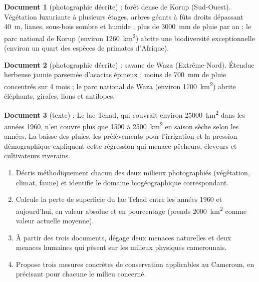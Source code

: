 \documentclass[11pt]{article}
\newcounter{popsec}
\newcounter{popsub}
\newcommand{\courssub}[1]{%
  \stepcounter{popsub}%
  \par\vspace{9pt}\noindent{\popxbold\fontsize{11.5}{13}\selectfont\color{popink}{\color{poporange}\thepopsec.\thepopsub}\hspace{6pt}#1}\par\nopagebreak\vspace{4pt}
}
\begin{document}
\courssub{Je me prépare au Bac}

\begin{exercice}
\textbf{Document 1} (photographie décrite) : forêt dense de Korup (Sud-Ouest). Végétation luxuriante à plusieurs étages, arbres géants à fûts droits dépassant \SI{40}{m}, lianes, sous-bois sombre et humide ; plus de \SI{3000}{mm} de pluie par an ; le parc national de Korup (environ \SI{1260}{km\squared}) abrite une biodiversité exceptionnelle (environ un quart des espèces de primates d'Afrique).

\textbf{Document 2} (photographie décrite) : savane de Waza (Extrême-Nord). Étendue herbeuse jaunie parsemée d'acacias épineux ; moins de \SI{700}{mm} de pluie concentrés sur 4 mois ; le parc national de Waza (environ \SI{1700}{km\squared}) abrite éléphants, girafes, lions et antilopes.

\textbf{Document 3} (texte) : \og Le lac Tchad, qui couvrait environ \SI{25000}{km\squared} dans les années 1960, n'en couvre plus que \SI{1500}{} à \SI{2500}{km\squared} en saison sèche selon les années. La baisse des pluies, les prélèvements pour l'irrigation et la pression démographique expliquent cette régression qui menace pêcheurs, éleveurs et cultivateurs riverains. \fg

\begin{enumerate}
\item Décris méthodiquement chacun des deux milieux photographiés (végétation, climat, faune) et identifie le domaine biogéographique correspondant.
\item Calcule la perte de superficie du lac Tchad entre les années 1960 et aujourd'hui, en valeur absolue et en pourcentage (prends \SI{2000}{km\squared} comme valeur actuelle moyenne).
\item À partir des trois documents, dégage deux menaces naturelles et deux menaces humaines qui pèsent sur les milieux physiques camerounais.
\item Propose trois mesures concrètes de conservation applicables au Cameroun, en précisant pour chacune le milieu concerné.
\end{enumerate}
\end{exercice}
\end{document}
